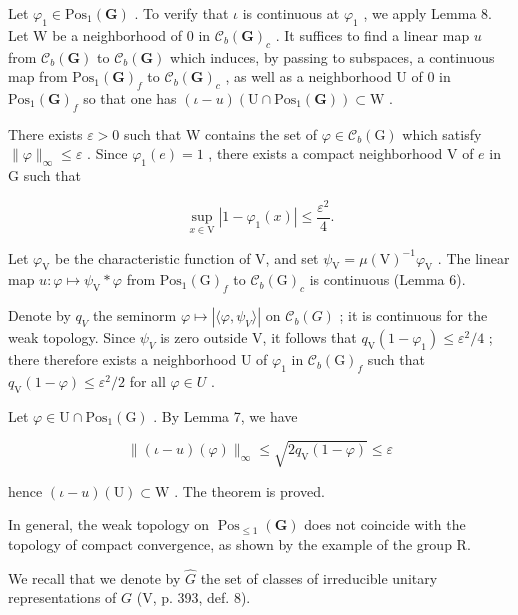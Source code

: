 Let \(\varphi_{1} \in \mathrm{Pos}_{1}(\mathbf{G})\) . To verify that \(\iota\) is continuous at \(\varphi_{1}\) , we apply Lemma 8. Let W be a neighborhood of 0 in \(\mathcal{C}_{b}(\mathbf{G})_{c}\) . It suffices to find a linear map \(u\) from \(\mathcal{C}_{b}(\mathbf{G})\) to \(\mathcal{C}_{b}(\mathbf{G})\) which induces, by passing to subspaces, a continuous map from \(\mathrm{Pos}_{1}(\mathbf{G})_{f}\) to \(\mathcal{C}_{b}(\mathbf{G})_{c}\) , as well as a neighborhood U of 0 in \(\mathrm{Pos}_{1}(\mathbf{G})_{f}\) so that one has \((\iota - u)(\mathrm{U} \cap \mathrm{Pos}_{1}(\mathbf{G})) \subset \mathrm{W}\) .

There exists \(\varepsilon > 0\) such that W contains the set of \(\varphi \in \mathcal{C}_b(\mathrm{G})\) which satisfy \(\| \varphi \|_{\infty} \leqslant \varepsilon\) . Since \(\varphi_1(e) = 1\) , there exists a compact neighborhood V of \(e\) in G such that

\[
\sup _ {x \in \mathrm{V}} | 1 - \varphi_ {1} (x) | \leqslant \frac {\varepsilon^ {2}}{4}.
\]

Let \(\varphi_{\mathrm{V}}\) be the characteristic function of V, and set \(\psi_{\mathrm{V}} = \mu (\mathrm{V})^{-1}\varphi_{\mathrm{V}}\) . The linear map \(u\colon \varphi \mapsto \psi_{\mathrm{V}}*\varphi\) from \(\mathrm{Pos}_1(\mathrm{G})_f\) to \(\mathcal{C}_b(\mathrm{G})_c\) is continuous (Lemma 6).

Denote by \(q_{V}\) the seminorm \(\varphi\mapsto|\langle\varphi,\psi_{V}\rangle|\) on \(\mathcal{C}_{b}(G)\) ; it is continuous for the weak topology. Since \(\psi_{V}\) is zero outside V, it follows that \(q_{\mathrm{V}}(1-\varphi_{1})\leqslant\varepsilon^{2}/4\) ; there therefore exists a neighborhood U of \(\varphi_{1}\) in \(\mathcal{C}_{b}(\mathrm{G})_{f}\) such that \(q_{\mathrm{V}}(1-\varphi)\leqslant\varepsilon^{2}/2\) for all \(\varphi\in U\) .

Let \(\varphi\in\mathrm{U}\cap\mathrm{Pos}_{1}(\mathrm{G})\) . By Lemma 7, we have

\[
\| (\iota - u) (\varphi) \| _ {\infty} \leqslant \sqrt {2 q _ {\mathrm{V}} (1 - \varphi)} \leqslant \varepsilon
\]

hence \((\iota - u)(\mathrm{U}) \subset \mathrm{W}\) . The theorem is proved.

In general, the weak topology on \(\operatorname{Pos}_{\leqslant1}(\mathbf{G})\) does not coincide with the topology of compact convergence, as shown by the example of the group R.

We recall that we denote by \(\widehat{G}\) the set of classes of irreducible unitary representations of \(G\) (V, p. 393, def. 8).

